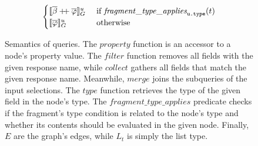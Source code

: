 \begin{figure}[t]
\begin{align*}
\begin{cases}
    \llbracket \overline{\beta} \mathbin{+\mkern-5mu+} \overline{\varphi} \rrbracket^{u}_{G} 
    & \text{ if }\mathit{fragment\_type\_applies}_{\texttt{u.type}}(t)\\
    \llbracket \overline{\varphi} \rrbracket^{u}_{G} 
    & \text{ otherwise}
    \end{cases}
    \end{align*}
    \caption{Semantics of \gql queries. The $\mathit{property}$ function is an accessor to a node's property value. The $\mathit{filter}$ function removes all fields with the given response name, while $\mathit{collect}$ gathers all fields that match the given response name. 
    Meanwhile, $\mathit{merge}$ joins the subqueries of the input selections. The $\mathit{type}$ function retrieves the type of the given field in the node's type.
	The $\mathit{fragment\_type\_applies}$ predicate checks if the fragment's type condition is related to the node's type and whether its contents should be evaluated in the given node.
	Finally, $E$ are the graph's edges, while $L_{t}$ is simply the list type.
    }
    \label{fig:semantics}
\end{figure}



